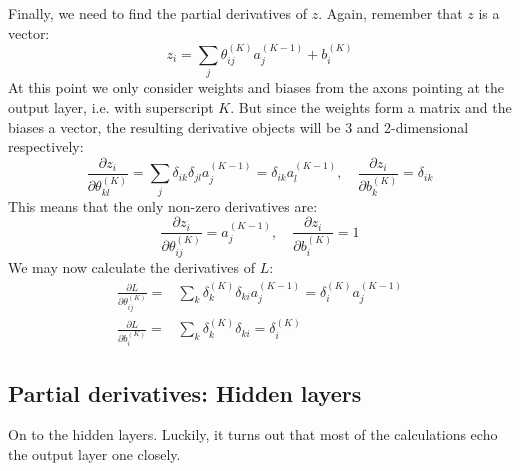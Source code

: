 \documentclass[12pt, a4paper]{article}
\numberwithin{equation}{section}
\begin{document}
Finally, we need to find the partial derivatives of $z$. Again, remember that $z$ is a vector:
\begin{equation}
z_i=\sum_j\theta^{(K)}_{ij}a^{(K-1)}_j+b^{(K)}_i
\end{equation}
At this point we only consider weights and biases from the axons pointing at the output layer, i.e. with superscript $K$. But since the weights form a matrix and the biases a vector, the resulting derivative objects will be 3 and 2-dimensional respectively:
\begin{equation}
\frac{\partial z_i}{\partial\theta^{(K)}_{kl}}=\sum_j\delta_{ik}\delta_{jl}a^{(K-1)}_j=\delta_{ik}a^{(K-1)}_l,\quad\frac{\partial z_i}{\partial b^{(K)}_k}=\delta_{ik}
\end{equation}
This means that the only non-zero derivatives are:
\begin{equation}
\frac{\partial z_i}{\partial\theta^{(K)}_{ij}}=a^{(K-1)}_j,\quad\frac{\partial z_i}{\partial b^{(K)}_i}=1
\end{equation}
We may now calculate the derivatives of $L$:
\begin{align}
\label{weight_derivative}
\frac{\partial L}{\partial\theta^{(K)}_{ij}}=&\sum_k\delta^{(K)}_k\delta_{ki}a^{(K-1)}_j=\delta^{(K)}_i a^{(K-1)}_j\\
\label{bias_derivative}
\frac{\partial L}{\partial b^{(K)}_i}=&\sum_k\delta^{(K)}_k\delta_{ki}=\delta^{(K)}_i
\end{align}

\subsection{Partial derivatives: Hidden layers}
On to the hidden layers. Luckily, it turns out that most of the calculations echo the output layer one closely.
\end{document}
